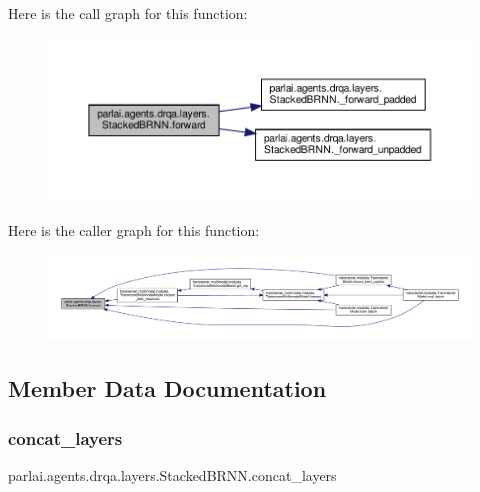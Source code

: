 Here is the call graph for this function\+:
\nopagebreak
\begin{figure}[H]
\begin{center}
\leavevmode
\includegraphics[width=350pt]{classparlai_1_1agents_1_1drqa_1_1layers_1_1StackedBRNN_a77f43de1cd3b3461c3ce791973aa9eb5_cgraph}
\end{center}
\end{figure}
Here is the caller graph for this function\+:
\nopagebreak
\begin{figure}[H]
\begin{center}
\leavevmode
\includegraphics[width=350pt]{classparlai_1_1agents_1_1drqa_1_1layers_1_1StackedBRNN_a77f43de1cd3b3461c3ce791973aa9eb5_icgraph}
\end{center}
\end{figure}


\subsection{Member Data Documentation}
\mbox{\label{classparlai_1_1agents_1_1drqa_1_1layers_1_1StackedBRNN_aa70222a319180cce80be6827c07d391a}} 
\subsubsection{\texorpdfstring{concat\+\_\+layers}{concat\_layers}}
{\footnotesize\ttfamily parlai.\+agents.\+drqa.\+layers.\+Stacked\+B\+R\+N\+N.\+concat\+\_\+layers}



